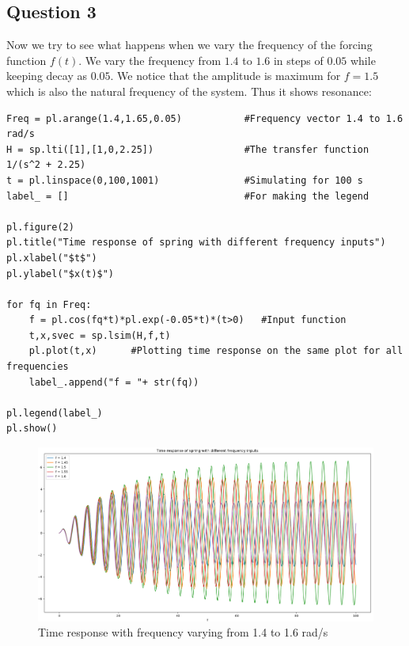 \documentclass[11pt, a4paper]{article}
\begin{document}
\subsection{Question 3}
    Now we try to see what happens when we vary the frequency of the forcing function $f(t)$. We vary the frequency from $1.4$ to $1.6$ in steps of $0.05$ while keeping decay as $0.05$. We notice that the amplitude is maximum for $f = 1.5$ which is also the natural frequency of the system. Thus it shows resonance:
    \begin{verbatim}
Freq = pl.arange(1.4,1.65,0.05)           #Frequency vector 1.4 to 1.6 rad/s
H = sp.lti([1],[1,0,2.25])                #The transfer function 1/(s^2 + 2.25)
t = pl.linspace(0,100,1001)               #Simulating for 100 s
label_ = []                               #For making the legend                

pl.figure(2)
pl.title("Time response of spring with different frequency inputs")
pl.xlabel("$t$")
pl.ylabel("$x(t)$")

for fq in Freq:
    f = pl.cos(fq*t)*pl.exp(-0.05*t)*(t>0)   #Input function
    t,x,svec = sp.lsim(H,f,t)
    pl.plot(t,x)      #Plotting time response on the same plot for all frequencies
    label_.append("f = "+ str(fq))
    
pl.legend(label_)
pl.show()
    \end{verbatim}
    \begin{figure}[!h]
        \centering
        \includegraphics[scale = 0.44]{Figure 3.png}
        \caption{Time response with frequency varying from 1.4 to 1.6 rad/s}
        \label{fig:Figure 3}
    \end{figure}
    
\end{document}

